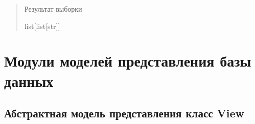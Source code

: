 \documentclass[letterpaper,10pt,russian]{sphinxmanual}
\begin{document}
\begin{fulllineitems}
\begin{fulllineitems}
\begin{description}
\end{description}
\begin{quote}\begin{description}
\sphinxAtStartPar
Результат выборки

\sphinxAtStartPar
list{[}list{[}str{]}{]}

\end{description}\end{quote}

\end{fulllineitems}


\end{fulllineitems}


\sphinxstepscope


\section{Модули моделей представления базы данных}
\label{\detokenize{database.sqlite3_interface.views:id1}}\label{\detokenize{database.sqlite3_interface.views::doc}}

\subsection{Абстрактная модель представления \sphinxhyphen{} класс View}
\label{\detokenize{database.sqlite3_interface.views:module-database.sqlite3_interface.views.view}}\label{\detokenize{database.sqlite3_interface.views:view}}
\end{document}
